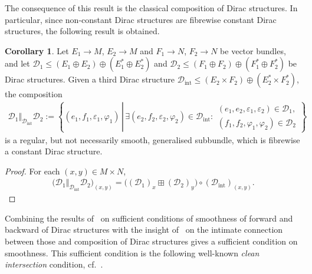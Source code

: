 \documentclass[preprint,12pt]{elsarticle}
\theoremstyle{definition}
\newtheorem{corollary}[theorem]{Corollary}
\newcommand{\set}[1]{\left\lbrace #1\right\rbrace}
\begin{document}
The consequence of this result is the classical composition of Dirac structures. In particular, since non-constant Dirac structures are fibrewise constant Dirac structures, the following result is obtained.

\begin{corollary}
Let $E_1\to M$, $E_2\to M$ and $F_1\to N$, $F_2\to N$ be vector bundles, and let $\mathcal{D}_1\leq (E_1\oplus E_2)\oplus(E_1^*\oplus E_2^*)$ and $\mathcal{D}_2\leq (F_1\oplus F_2)\oplus(F_1^*\oplus F_2^*)$ be Dirac structures. Given a third Dirac structure $\mathcal{D}_{\mathrm{int}}\leq (E_2\times F_2)\oplus(E_2^*\times F_2^*)$, the composition
\begin{align*}
\mathcal{D}_1\Vert_{\mathcal{D}_{\mathrm{int}}}\mathcal{D}_2 := \set{(e_1,f_1,\varepsilon_1,\varphi_1)\,\left\vert\,\exists (e_2,f_2,\varepsilon_2,\varphi_2)\in\mathcal{D}_{\mathrm{int}}:\begin{array}{l}
(e_1,e_2,\varepsilon_1,\varepsilon_2)\in\mathcal{D}_1,\\
(f_1,f_2,\varphi_1,\varphi_2)\in\mathcal{D}_2
\end{array}\right.\!\!}
\end{align*}
is a regular, but not necessarily smooth, generalised subbundle, which is fibrewise a constant Dirac structure.
\end{corollary}
\begin{proof}
For each $(x,y)\in M\times N$,
\begin{align*}
\big(\mathcal{D}_1\Vert_{\mathcal{D}_{\mathrm{int}}}\mathcal{D}_2\big)_{(x,y)} = \big((\mathcal{D}_1)_x\boxplus(\mathcal{D}_2)_y\big)\circ(\mathcal{D}_{\mathrm{int}})_{(x,y)}.
\end{align*}
\end{proof}

Combining the results of~\cite{Burs13} on sufficient conditions of smoothness of forward and backward of Dirac structures with the insight of~\cite{Interconnection18} on the intimate connection between those and composition of Dirac structures gives a sufficient condition on smoothness. This sufficient condition is the following well-known \textit{clean intersection} condition, cf.~\cite[Proposition 3.15]{Vyso20}.
\end{document}
